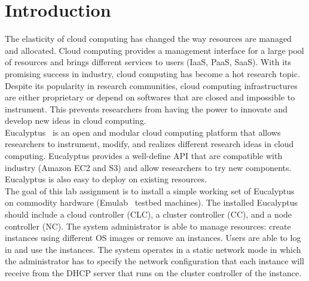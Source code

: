 \section{Introduction}
The elasticity of cloud computing has changed 
the way resources are managed and allocated. 
Cloud computing provides a management interface 
for a large pool of resources and brings different 
services to users (IaaS, PaaS, SaaS). With its 
promising success in industry, cloud computing has become a 
 hot research topic. Despite its popularity in research 
 communities, cloud computing infrastructures are either 
 proprietary or depend on softwares that are closed and 
 impossible to instrument. This prevents researchers from 
having the power to innovate and develop new ideas in cloud computing.\\
Eucalyptus~\cite{nurmi2009eucalyptus} is an open and modular cloud computing platform that 
allows researchers to instrument, modify, and realizes different 
research ideas in cloud computing. Eucalyptus provides a well-define API 
that are compatible with industry (Amazon EC2 and S3) and allow 
researchers to try new components. Eucalyptus is also easy to deploy 
on existing resources.\\
The goal of this lab assignment is to install a simple working set of 
Eucalyptus on commodity hardware (Emulab~\cite{white2002integrated} testbed machines). 
The installed Eucalyptus should include 
a cloud controller (CLC), a cluster controller (CC), and a node controller (NC). 
The system administrator is able to manage resources: create instances using different 
OS images or remove an instances. Users are able to log in and use the instances. 
The system operates in a static network mode in which the administrator 
has to specify the network configuration that each instance will receive from 
the DHCP server that runs on the cluster controller of the instance. 



